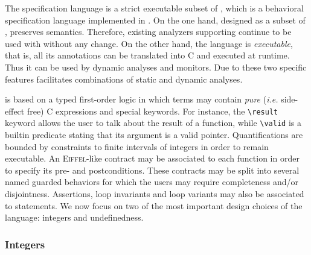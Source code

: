 The specification language \eacsl is a strict executable subset of \acsl, which
is a behavioral specification language implemented in \framac. On the one hand,
designed as a subset of \acsl{}, \eacsl{} preserves \acsl{} semantics.
Therefore, existing \framac analyzers supporting \acsl{} continue to be used
with \eacsl{} without any change. On the other hand, the \eacsl{} language is
\textit{executable}, that is, all its annotations can be translated into C and
executed at runtime.  Thus it can be used by dynamic analyses and monitors.  Due
to these two specific features %
\eacsl{} facilitates combinations of static and dynamic analyses.

\eacsl is based on a typed first-order logic in which terms may contain
\textit{pure} (\emph{i.e.} side-effect free) C expressions and special keywords.
For instance, the \lstinline{\result} keyword allows the user to talk about the
result of a function, while \lstinline{\valid} is a builtin predicate stating
that its argument is a valid pointer. Quantifications are bounded by constraints
to finite intervals of integers
in order to remain executable. An \textsc{Eiffel}-like contract \cite{eiffel}
may be associated to each function in order to specify its pre- and
postconditions. These contracts may be split into several named guarded
behaviors for which the users may require completeness and/or
disjointness. Assertions, loop invariants and loop variants may also be
associated to statements. We now focus on two of the most important design
choices of the language: integers and undefinedness.

\subsubsection{Integers}\label{sec:eacsl-integers}

